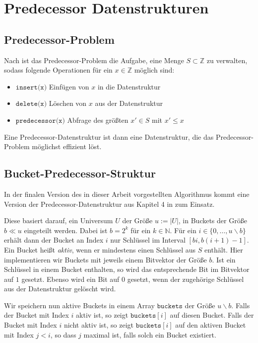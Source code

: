 \section{Predecessor Datenstrukturen}

\subsection{Predecessor-Problem}

Nach \cite{dinklage_engineering_2021} ist das Predecessor-Problem die Aufgabe, eine Menge $S \subset \mathbb{Z}$ zu verwalten, sodass folgende Operationen für ein $x \in \mathbb{Z}$ möglich sind:

\begin{itemize}
	\item $\texttt{insert(x)}$ Einfügen von $x$ in die Datenstruktur
	\item $\texttt{delete(x)}$ Löschen von $x$ aus der Datenstruktur
	\item $\texttt{predecessor(x)}$ Abfrage des größten $x' \in S$ mit $x' \leq x$
\end{itemize}

Eine Predecessor-Datenstruktur ist dann eine Datenstruktur, die das Predecessor-Problem möglichst effizient löst.

\subsection{Bucket-Predecessor-Struktur}

In der finalen Version des in dieser Arbeit vorgestellten Algorithmus kommt eine Version der Predecessor-Datenstruktur aus Kapitel 4 in \cite{dinklage_engineering_2021} zum Einsatz.

Diese basiert darauf, ein Universum $U$ der Größe $u := |U|$, in Buckets der Größe $b \ll u$ eingeteilt werden. Dabei ist $b = 2^k$ für ein $k \in \mathbb{N}$. Für ein $i \in \{0, \dots, u \backslash b \}$ erhält dann der Bucket an Index $i$ nur Schlüssel im Interval $[bi, b(i + 1) - 1]$. Ein Bucket heißt \textit{aktiv}, wenn er mindestens einen Schlüssel aus $S$ enthält.
Hier implementieren wir Buckets mit jeweils einem Bitvektor der Größe $b$. Ist ein Schlüssel in einem Bucket enthalten, so wird das entsprechende Bit im Bitvektor auf $1$ gesetzt. Ebenso wird ein Bit auf $0$ gesetzt, wenn der zugehörige Schlüssel aus der Datenstruktur gelöscht wird.

Wir speichern nun aktive Buckets in einem Array $\texttt{buckets}$ der Größe $u \backslash b$. Falls der Bucket mit Index $i$ aktiv ist, so zeigt $\texttt{buckets}[i]$ auf diesen Bucket. Falls der Bucket mit Index $i$ nicht aktiv ist, so zeigt $\texttt{buckets}[i]$ auf den aktiven Bucket mit Index $j < i$, so dass $j$ maximal ist, falls solch ein Bucket existiert.

